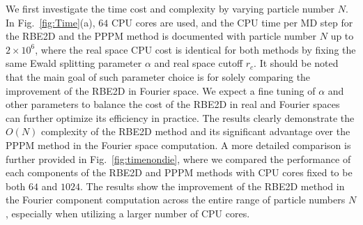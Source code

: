We first investigate the time cost and complexity by varying particle number $N$. 
In Fig.~\ref{fig:Time}(a), $64$ CPU cores are used, and the  CPU time per MD step for the RBE2D  {and the PPPM method} is documented with particle number $N$ up to $2\times 10^6$, where  {the real space CPU cost is identical for both methods by fixing the same Ewald splitting parameter $\alpha$ and real space cutoff $r_c$}.
 {It should be noted that the main goal of such parameter choice is for solely comparing the improvement of the RBE2D in Fourier space. We expect a fine tuning of $\alpha$ and other parameters to balance the cost of the RBE2D in real and Fourier spaces can further optimize its efficiency in practice.}
The results clearly  {demonstrate} the $O(N)$ complexity of the RBE2D method  {and its significant advantage over the PPPM method in the Fourier space computation.}
 {A more detailed comparison is further provided in Fig.~\ref{fig:timenondie}, where we compared the performance of each components of the RBE2D and PPPM methods with CPU cores fixed to be both $64$ and $1024$. The results show the improvement of the RBE2D method in the Fourier component computation across the entire range of particle numbers $N$, especially when utilizing a larger number of CPU cores.} %



